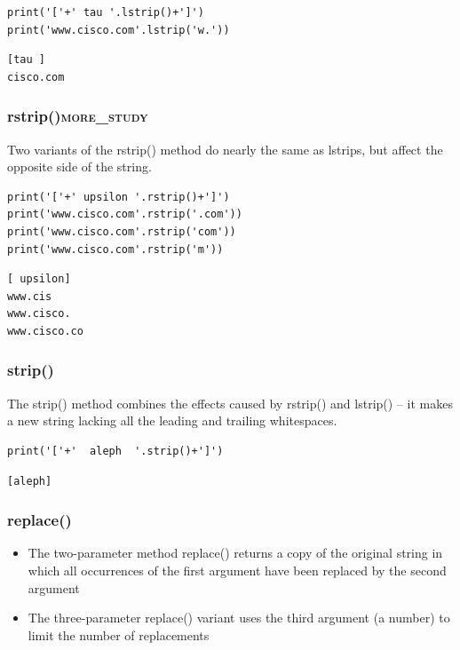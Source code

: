 \documentclass[11pt]{article}
\begin{document}
\begin{verbatim}
print('['+' tau '.lstrip()+']')
print('www.cisco.com'.lstrip('w.'))
\end{verbatim}

\begin{verbatim}
[tau ]
cisco.com
\end{verbatim}

\subsubsection{rstrip()\hfill{}\textsc{more\_study}}
\label{sec:org066f86e}
Two variants of the rstrip() method do nearly the same as lstrips, but
affect the opposite side of the string.

\begin{verbatim}
print('['+' upsilon '.rstrip()+']')
print('www.cisco.com'.rstrip('.com'))
print('www.cisco.com'.rstrip('com'))
print('www.cisco.com'.rstrip('m'))
\end{verbatim}

\begin{verbatim}
[ upsilon]
www.cis
www.cisco.
www.cisco.co
\end{verbatim}

\subsubsection{strip()}
\label{sec:orgfd947a7}
The strip() method combines the effects caused by rstrip() and
lstrip() – it makes a new string lacking all the leading and trailing
whitespaces.

\begin{verbatim}
print('['+'  aleph  '.strip()+']')
\end{verbatim}

\begin{verbatim}
[aleph]
\end{verbatim}

\subsubsection{replace()}
\label{sec:org3a6eeb1}
\begin{itemize}
\item The two-parameter method replace() returns a copy of the original
string in which all occurrences of the first argument have been
replaced by the second argument
\item The three-parameter replace() variant uses the third argument (a
number) to limit the number of replacements
\end{itemize}
\end{document}
